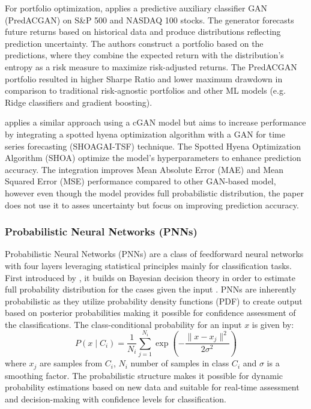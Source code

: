 For portfolio optimization, \textcite{kim2023portfolio} applies a predictive auxiliary classifier GAN (PredACGAN) on S\&P 500 and NASDAQ 100 stocks. The generator forecasts future returns based on historical data and produce distributions reflecting prediction uncertainty. The authors construct a portfolio based on the predictions, where they combine the expected return with the distribution's entropy as a risk measure to maximize risk-adjusted returns. The PredACGAN portfolio resulted in higher Sharpe Ratio and lower maximum drawdown in comparison to traditional risk-agnostic portfolios and other ML models (e.g. Ridge classifiers and gradient boosting).

\textcite{salama2024gan} applies a similar approach using a cGAN model but aims to increase performance by integrating a spotted hyena optimization algorithm with a GAN for time series forecasting (SHOAGAI-TSF) technique. The Spotted Hyena Optimization Algorithm (SHOA) optimize the model's hyperparameters to enhance prediction accuracy. The integration improves Mean Absolute Error (MAE) and Mean Squared Error (MSE) performance compared to other GAN-based model, however even though the model provides full probabilistic distribution, the paper does not use it to asses uncertainty but focus on improving prediction accuracy. 



\subsubsection{Probabilistic Neural Networks (PNNs)}
Probabilistic Neural Networks (PNNs) are a class of feedforward neural networks with four layers leveraging statistical principles mainly for classification tasks. First introduced by \textcite{Specht1990pnn}, it builds on Bayesian decision theory in order to estimate full probability distribution for the cases given the input \parencite{Specht1990pnn}. PNNs are inherently probabilistic as they utilize probability density functions (PDF) to create output based on posterior probabilities making it possible for confidence assessment of the classifications. The class-conditional probability for an input $x$ is given by:
\begin{equation}
P(x \mid C_i) = \frac{1}{N_i} \sum_{j=1}^{N_i} \exp \left( -\frac{\| x - x_j \|^2}{2\sigma^2} \right)
\end{equation}
where $x_j$ are samples from $C_i$, $N_i$ number of samples in class $C_i$ and $\sigma$ is a smoothing factor. 
The probabilistic structure makes it possible for dynamic probability estimations based on new data and suitable for real-time assessment and decision-making with confidence levels for classification. 

